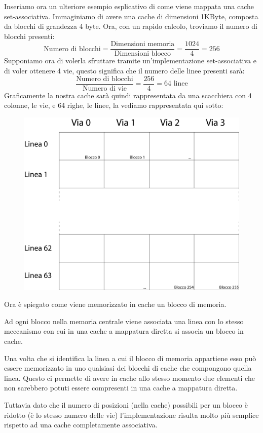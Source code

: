\documentclass[class=book, crop=false, oneside]{standalone}
\begin{document}
Inseriamo ora un ulteriore esempio esplicativo di come viene mappata una cache set-associativa. Immaginiamo di avere una cache di dimensioni \unit{1}{KByte}, composta da blocchi di grandezza 4 byte.
Ora, con un rapido calcolo, troviamo il numero di blocchi presenti:
\begin{equation*}
	\textrm{Numero di blocchi} = \frac{\textrm{Dimensioni memoria}}{\textrm{Dimensioni blocco}} = \frac{1024}{4} = 256
\end{equation*}
Supponiamo ora di volerla sfruttare tramite un'implementazione set-associativa e di voler ottenere 4 vie, questo significa che il numero delle linee presenti sarà:
\begin{equation*}
	\frac{\textrm{Numero di blocchi}}{\textrm{Numero di vie}} = \frac{256}{4} = 64 \textrm{ linee}
\end{equation*}
Graficamente la nostra cache sarà quindi rappresentata da una scacchiera con 4 colonne, le vie, e 64 righe, le linee, la vediamo rappresentata qui sotto:
\begin{figure}[H]
	\centering
	\includegraphics[width=.5\textwidth, keepaspectratio]{esempio-associativa}
\end{figure}
Ora è spiegato come viene memorizzato in cache un blocco di memoria.

Ad ogni blocco nella memoria centrale viene associata una linea con lo stesso meccanismo con cui in una cache a mappatura diretta si associa un blocco in cache.

Una volta che si identifica la linea a cui il blocco di memoria appartiene esso può essere memorizzato in uno qualsiasi dei blocchi di cache che compongono quella linea. Questo ci permette di avere in cache allo stesso momento due elementi che non sarebbero potuti essere compresenti in una cache a mappatura diretta.

Tuttavia dato che il numero di posizioni (nella cache) possibili per un blocco è ridotto (è lo stesso numero delle vie) l'implementazione risulta molto più semplice rispetto ad una cache completamente associativa.
\end{document}
